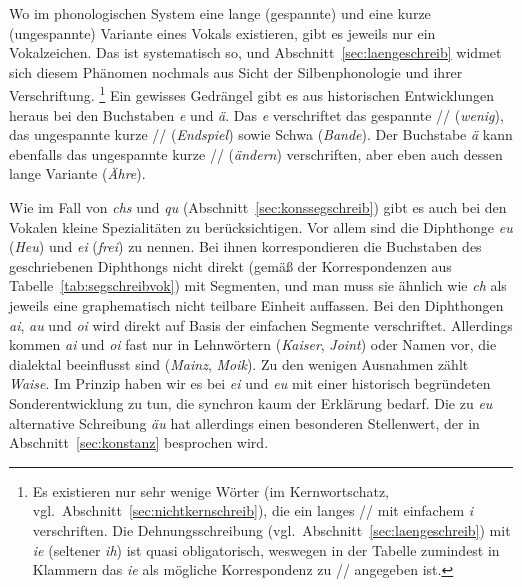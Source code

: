 Wo im phonologischen System eine lange (gespannte) und eine kurze (ungespannte) Variante eines Vokals existieren, gibt es jeweils nur ein Vokalzeichen.
Das ist systematisch so, und Abschnitt~\ref{sec:laengeschreib} widmet sich diesem Phänomen nochmals aus Sicht der Silbenphonologie und ihrer Verschriftung.%
\footnote{Es existieren nur sehr wenige Wörter (im Kernwortschatz, vgl.\ Abschnitt~\ref{sec:nichtkernschreib}), die ein langes // mit einfachem \textit{i} verschriften.
Die Dehnungsschreibung (vgl.\ Abschnitt~\ref{sec:laengeschreib}) mit \textit{ie} (seltener \textit{ih}) ist quasi obligatorisch, weswegen in der Tabelle zumindest in Klammern das \textit{ie} als mögliche Korrespondenz zu // angegeben ist.}
Ein gewisses Gedrängel gibt es aus historischen Entwicklungen heraus bei den Buchstaben \textit{e} und \textit{ä}.
Das \textit{e} verschriftet das gespannte // (\textit{wenig}), das ungespannte kurze // (\textit{Endspiel}) sowie Schwa (\textit{Bande}).
Der Buchstabe \textit{ä} kann ebenfalls das ungespannte kurze // (\textit{ändern}) verschriften, aber eben auch dessen lange Variante (\textit{Ähre}).

\newpage

Wie im Fall von \textit{chs} und \textit{qu} (Abschnitt~\ref{sec:konssegschreib}) gibt es auch bei den Vokalen kleine Spezialitäten zu berücksichtigen.
Vor allem sind die Diphthonge \textit{eu} (\textit{Heu}) und \textit{ei} (\textit{frei}) zu nennen.
Bei ihnen korrespondieren die Buchstaben des geschriebenen Diphthongs nicht direkt (gemäß der Korrespondenzen aus Tabelle~\ref{tab:segschreibvok}) mit Segmenten, und man muss sie ähnlich wie \textit{ch} als jeweils eine graphematisch nicht teilbare Einheit auffassen.
Bei den Diphthongen \textit{ai}, \textit{au} und \textit{oi} wird direkt auf Basis der einfachen Segmente verschriftet.
Allerdings kommen \textit{ai} und \textit{oi} fast nur in Lehnwörtern (\textit{Kaiser}, \textit{Joint}) oder Namen vor, die dialektal beeinflusst sind (\textit{Mainz}, \textit{Moik}).
Zu den wenigen Ausnahmen zählt \textit{Waise}.
Im Prinzip haben wir es bei \textit{ei} und \textit{eu} mit einer historisch begründeten Sonderentwicklung zu tun, die synchron kaum der Erklärung bedarf.
Die zu \textit{eu} alternative Schreibung \textit{äu} hat allerdings einen besonderen Stellenwert, der in Abschnitt~\ref{sec:konstanz} besprochen wird.

